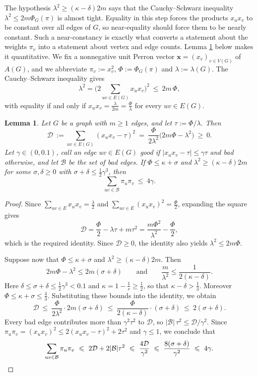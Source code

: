 \documentclass[11pt, a4paper]{article}
\newtheorem{lemma}[theorem]{Lemma}
\theoremstyle{definition}
\theoremstyle{plain}
\renewcommand{\le}{\leqslant}
\renewcommand{\ge}{\geqslant}
\begin{document}
\smallskip
The hypothesis $\lambda^{2}\ge (\kappa -\delta )2m$ says that
the Cauchy--Schwarz inequality 
$\lambda^{2}\le 2m\Phi_G(\pi )$ is
almost tight. Equality in this step forces the products
$x_ux_v$ to be constant over all edges of $G$, so
near-equality should force them to be nearly constant. Such a
near-constancy is exactly what converts a statement about the
weights $\pi_v$ into a statement about vertex and edge counts.
Lemma \ref{lem:good-edges} below makes it quantitative.
We fix a nonnegative unit Perron vector
$\bm{x}=(x_v)_{v\in V(G)}$ of $A(G)$, and we abbreviate
$\pi_v:=x_v^{2}$, $\Phi :=\Phi_G(\pi )$ and
$\lambda :=\lambda (G)$. The Cauchy--Schwarz inequality gives
\[
  \lambda^{2}
  =\biggl( 2\!\!\sum_{uv\in E(G)}\! x_ux_v \biggr)^{2}
  \ \le\ 2m\,\Phi ,
\]
with equality if and only if $x_ux_v= \frac{\lambda}{2m} = \frac{\Phi}{\lambda}$
for every $uv\in E(G)$. 


\begin{lemma} \label{lem:good-edges}
Let $G$ be a graph with $m\ge 1$ edges, and let $\tau :=\Phi /\lambda$. Then
\[
  \mathcal{D}\ :=\!\!\sum_{uv\in E(G)}\!\!
  (x_ux_v-\tau )^{2}
  \ =\ \frac{\Phi}{2\lambda^{2}}
       \bigl(2m\Phi -\lambda^{2}\bigr)\ \ge\ 0 .
\]
Let $\gamma \in (0, 0.1)$, call an edge $uv\in E(G)$ \emph{good} if $|x_ux_v-\tau |\le \gamma \tau$ and \emph{bad} otherwise, and let $\mathcal{B}$ be the set of bad edges. 
If $  \Phi  \le \kappa +\sigma $ 
and  $ \lambda^{2} \ge (\kappa -\delta )2m$ 
for some $\sigma ,\delta \ge 0$ with
$\sigma +\delta \le \frac{1}{2}\gamma^{3}$, then
\[
  \sum_{uv\in \mathcal{B}}\pi_u\pi_v\ \le\ 4\gamma .
\]
\end{lemma}

\begin{proof}
Since $\sum_{uv\in E}x_ux_v 
=\frac{\lambda}{2}$ and
$\sum_{uv\in E}(x_ux_v)^{2}=\frac{\Phi}{2}$, expanding the
square gives
\[
  \mathcal{D}=\frac{\Phi}{2}-\lambda \tau +m\tau^{2}
  =\frac{m\Phi^{2}}{\lambda^{2}}-\frac{\Phi}{2},
\]
which is the required identity. Since $\mathcal{D}\ge 0$, the identity also yields $\lambda^{2}\le 2m\Phi$. 


Suppose now that $\Phi \le \kappa +\sigma$ and
$\lambda^{2}\ge (\kappa -\delta )2m$. Then
\[
  2m\Phi -\lambda^{2}\le 2m(\sigma +\delta )
  \qquad \text{and} \qquad
  \frac{m}{\lambda^{2}}\le \frac{1}{2(\kappa -\delta )} .
\]
Here $\delta \le \sigma +\delta \le \frac12\gamma^{3}<0.1$
and $\kappa =1-\frac1r\ge \frac12$, so that
$\kappa -\delta >\frac13$. Moreover
$\Phi \le \kappa +\sigma \le \frac43$. Substituting these
bounds into the identity, we obtain
\[
  \mathcal{D}\ \le\ \frac{\Phi}{2\lambda^{2}}
  \cdot 2m (\sigma + \delta)
  \ \le\ \frac{\Phi }{2(\kappa -\delta )} \cdot
  (\sigma + \delta) \
  \le\ 2 (\sigma + \delta) .
\] 
Every bad edge contributes more than $\gamma^{2}\tau^{2}$ to
$\mathcal{D}$, so
$|\mathcal{B}|\,\tau^{2}\le \mathcal{D}/\gamma^{2}$. Since
$\pi_u\pi_v=(x_ux_v)^{2}\le 2(x_ux_v-\tau )^{2}+2\tau^{2}$
and $\gamma \le 1$, we conclude that
\[
  \sum_{uv\in \mathcal{B}}\pi_u\pi_v
  \ \le\ 2\mathcal{D}+2|\mathcal{B}|\tau^{2}
  \ \le\ \frac{4\mathcal{D}}{\gamma^{2}}
  \ \le\ \frac{8(\sigma + \delta)}{\gamma^{2}}\ \le\ 4\gamma .
  \qedhere
\]
\end{proof}
\end{document}
